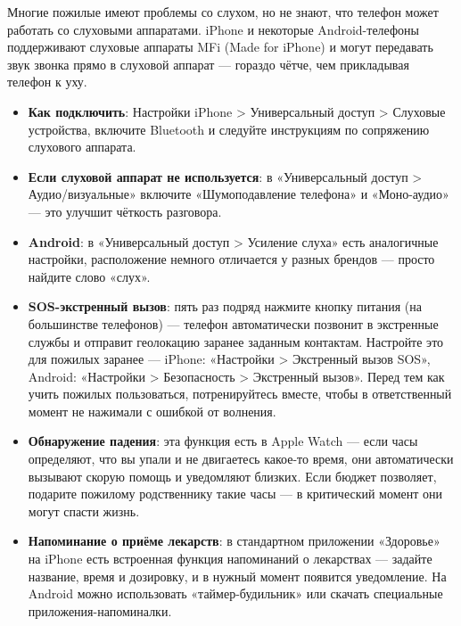 
Многие пожилые имеют проблемы со слухом, но не знают, что телефон может работать со слуховыми аппаратами. iPhone и некоторые Android-телефоны поддерживают слуховые аппараты MFi (Made for iPhone) и могут передавать звук звонка прямо в слуховой аппарат — гораздо чётче, чем прикладывая телефон к уху.

\begin{itemize}
  \item \textbf{Как подключить}: Настройки iPhone > Универсальный доступ > Слуховые устройства, включите Bluetooth и следуйте инструкциям по сопряжению слухового аппарата.
  \item \textbf{Если слуховой аппарат не используется}: в «Универсальный доступ > Аудио/визуальные» включите «Шумоподавление телефона» и «Моно-аудио» — это улучшит чёткость разговора.
  \item \textbf{Android}: в «Универсальный доступ > Усиление слуха» есть аналогичные настройки, расположение немного отличается у разных брендов — просто найдите слово «слух».
\end{itemize}


\begin{itemize}
  \item \textbf{SOS-экстренный вызов}: пять раз подряд нажмите кнопку питания (на большинстве телефонов) — телефон автоматически позвонит в экстренные службы и отправит геолокацию заранее заданным контактам. Настройте это для пожилых заранее — iPhone: «Настройки > Экстренный вызов SOS», Android: «Настройки > Безопасность > Экстренный вызов». Перед тем как учить пожилых пользоваться, потренируйтесь вместе, чтобы в ответственный момент не нажимали с ошибкой от волнения.
  \item \textbf{Обнаружение падения}: эта функция есть в Apple Watch — если часы определяют, что вы упали и не двигаетесь какое-то время, они автоматически вызывают скорую помощь и уведомляют близких. Если бюджет позволяет, подарите пожилому родственнику такие часы — в критический момент они могут спасти жизнь.
  \item \textbf{Напоминание о приёме лекарств}: в стандартном приложении «Здоровье» на iPhone есть встроенная функция напоминаний о лекарствах — задайте название, время и дозировку, и в нужный момент появится уведомление. На Android можно использовать «таймер-будильник» или скачать специальные приложения-напоминалки.
\end{itemize}

